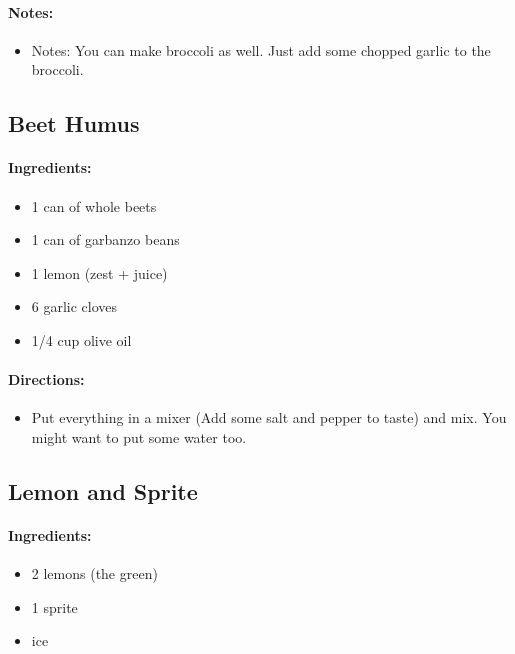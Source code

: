 \documentclass{article}
\begin{document}
\paragraph{Notes:}
\begin{itemize}
    \item Notes: You can make broccoli as well. Just add some chopped garlic to the broccoli.
\end{itemize}

\subsection{Beet Humus}

\paragraph{Ingredients:}
\begin{itemize}
    \item 1 can of whole beets
    \item 1 can of garbanzo beans
    \item 1 lemon (zest + juice)
    \item 6 garlic cloves
    \item 1/4 cup olive oil
\end{itemize}

\paragraph{Directions:}
\begin{itemize}
    \item Put everything in a mixer (Add some salt and pepper to taste) and mix. You might want to put some water too.
\end{itemize}

\subsection{Lemon and Sprite}

\paragraph{Ingredients:}
\begin{itemize}
    \item 2 lemons (the green)
    \item 1 sprite
    \item ice
\end{itemize}
\end{document}

